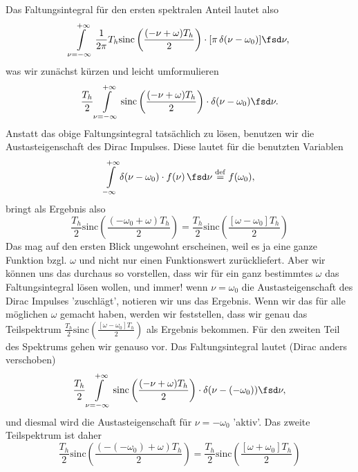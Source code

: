 \begin{ExCalc}
Das Faltungsintegral für den ersten spektralen Anteil lautet also
\begin{equation}
\int\limits_{\nu=-\infty}^{+\infty}
\frac{1}{2\pi}
T_h \mathrm{sinc}\left(\frac{(-\nu+\omega) T_h}{2}\right)
\cdot
[\pi \, \delta(\nu-\omega_0)] \fsd \nu,
\end{equation}
was wir zunächst kürzen und leicht umformulieren
\begin{equation}
\frac{T_h}{2} \int\limits_{\nu=-\infty}^{+\infty}
\mathrm{sinc}\left(\frac{(-\nu+\omega) T_h}{2}\right)
\cdot
\delta(\nu-\omega_0) \fsd \nu.
\end{equation}
%
Anstatt das obige Faltungsintegral tatsächlich zu lösen, benutzen wir
die Austasteigenschaft des Dirac Impulses. Diese lautet für die benutzten Variablen
\begin{equation}
\int\limits_{-\infty}^{+\infty} \delta(\nu-\omega_0) \cdot f(\nu) \, \fsd \nu \stackrel{\mathrm{def}}= f(\omega_0),
\end{equation}
bringt als Ergebnis also
\begin{equation}
\frac{T_h}{2}\mathrm{sinc}\left(\frac{(-\omega_0+\omega) T_h}{2}\right)=
\frac{T_h}{2}\mathrm{sinc}\left(\frac{[\omega-\omega_0] T_h}{2}\right)
\end{equation}
Das mag auf den ersten Blick ungewohnt erscheinen, weil es ja eine ganze Funktion
bzgl. $\omega$ und nicht nur einen Funktionswert zurückliefert.
Aber wir können uns das durchaus so vorstellen, dass wir für ein ganz bestimmtes
$\omega$ das Faltungsintegral lösen wollen, und immer!
wenn $\nu=\omega_0$ die Austasteigenschaft des Dirac Impulses 'zuschlägt',
notieren wir uns das Ergebnis.
Wenn wir das für alle möglichen $\omega$ gemacht haben, werden wir feststellen,
dass wir genau das Teilspektrum
$\frac{T_h}{2}\mathrm{sinc}\left(\frac{[\omega-\omega_0] T_h}{2}\right)$
als Ergebnis bekommen.
%
Für den zweiten Teil des Spektrums gehen wir genauso vor. Das Faltungsintegral
lautet (Dirac anders verschoben)
\begin{equation}
\frac{T_h}{2} \int\limits_{\nu=-\infty}^{+\infty}
\mathrm{sinc}\left(\frac{(-\nu+\omega) T_h}{2}\right)
\cdot
\delta(\nu-(-\omega_0)) \fsd \nu,
\end{equation}
und diesmal wird die Austasteigenschaft für $\nu=-\omega_0$ 'aktiv'.
Das zweite Teilspektrum ist daher
\begin{equation}
\frac{T_h}{2}\mathrm{sinc}\left(\frac{(-(-\omega_0)+\omega) T_h}{2}\right) =
\frac{T_h}{2}\mathrm{sinc}\left(\frac{[\omega+\omega_0] T_h}{2}\right)
\end{equation}

\end{ExCalc}
